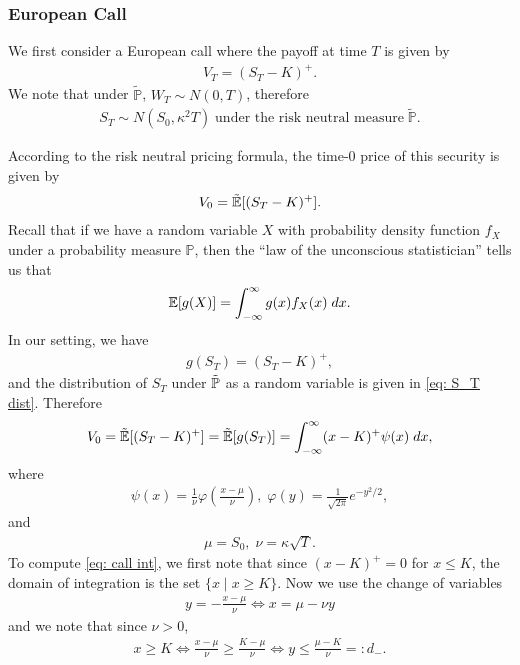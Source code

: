 \documentclass[reqno]{amsart}
\begin{document}
\subsubsection{European Call}
We first consider a European call where the payoff at time $T$ is given by 
\begin{align}
	 V_T = (S_T - K)^+.
\end{align}
We note that under $\tilde{\mathbb{P}}$, $ W_T \sim N(0, T)$, therefore
\begin{align}\label{eq: S_T dist}
S_T \sim N(S_0, \kappa^2T) \; \text{under the risk neutral measure} \; \tilde{\mathbb{P}}.
\end{align}

According to the risk neutral pricing formula, the time-0 price of this security is given by 
\begin{align}
	 V_0 = \tilde{\mathbb{E}}[(S_T - K)^+].
\end{align}
Recall that if we have a random variable $X$ with probability density function $f_X$ under a probability measure $\mathbb{P}$, then the ``law of the unconscious statistician'' tells us that 
\begin{align}
	 \mathbb{E}[g(X)] = \int_{-\infty}^\infty g(x) f_X(x) \; dx.
\end{align}
In our setting, we have 
\begin{align}
	 g(S_T) = (S_T - K)^+,
\end{align}
and the distribution of $S_T$ under $\tilde{\mathbb{P}}$ as a random variable is given in \eqref{eq: S_T dist}. Therefore 
\begin{align}\label{eq: call int}
	 V_0 = \tilde{\mathbb{E}}[(S_T - K)^+] =  \tilde{\mathbb{E}}[g(S_T)] = \int_{-\infty}^\infty (x-K)^+ \psi(x) \; dx,
\end{align}
where 
\begin{align}
	 \psi(x) = \frac{1}{\nu}\varphi\left(\frac{x-\mu}{\nu}\right), \; \varphi(y) = \frac{1}{\sqrt{2\pi}}e^{-y^2/2}, 
\end{align}
and
\begin{align}
	 \mu = S_0, \; \nu = \kappa \sqrt{T}.
\end{align}
To compute \eqref{eq: call int}, we first note that since $(x-K)^+ = 0$ for $x \le K$, the domain of integration is the set $\{x \mid x \ge K\}$. Now we use the change of variables 
\begin{align}
	 y = -\frac{x-\mu}{\nu} \Longleftrightarrow x = \mu - \nu y
\end{align}
and we note that since $\nu > 0$, 
\begin{align}
	 x \ge K \Longleftrightarrow \frac{x-\mu}{\nu} \ge \frac{K - \mu}{\nu} \Longleftrightarrow y \le \frac{\mu - K}{\nu} =: d_-.
\end{align}
\end{document}
